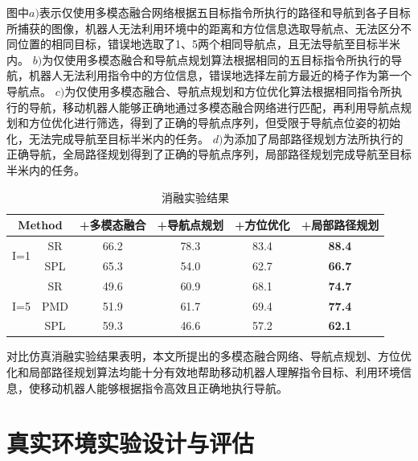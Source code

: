 图中$a)$表示仅使用多模态融合网络根据五目标指令所执行的路径和导航到各子目标所捕获的图像，机器人无法利用环境中的距离和方位信息选取导航点、无法区分不同位置的相同目标，错误地选取了1、5两个相同导航点，且无法导航至目标半米内。
$b)$为仅使用多模态融合和导航点规划算法根据相同的五目标指令所执行的导航，机器人无法利用指令中的方位信息，错误地选择左前方最近的椅子作为第一个导航点。
$c)$为仅使用多模态融合、导航点规划和方位优化算法根据相同指令所执行的导航，移动机器人能够正确地通过多模态融合网络进行匹配，再利用导航点规划和方位优化进行筛选，得到了正确的导航点序列，但受限于导航点位姿的初始化，无法完成导航至目标半米内的任务。
$d)$为添加了局部路径规划方法所执行的正确导航，全局路径规划得到了正确的导航点序列，局部路径规划完成导航至目标半米内的任务。


\begin{table}[]
    \caption{\label{Ablationtable}消融实验结果}
    \centering
        \begin{tabular}{cc|c|c|c|c}
        \hline
        \multicolumn{2}{c|}{Method}                     & +多模态融合 & +导航点规划 & +方位优化 & +局部路径规划 \\ \hline
        \multicolumn{1}{c|}{\multirow{2}{*}{I=1}} & SR  & 66.2   & 78.3   & 83.4  & \textbf{88.4}    \\
        \multicolumn{1}{c|}{}                     & SPL & 65.3   & 54.0   & 62.7  & \textbf{66.7}    \\ \hline
        \multicolumn{1}{c|}{\multirow{3}{*}{I=5}} & SR  & 49.6   & 60.9   & 68.1  & \textbf{74.7}    \\
        \multicolumn{1}{c|}{}                     & PMD & 51.9   & 61.7   & 69.4  & \textbf{77.4}    \\
        \multicolumn{1}{c|}{}                     & SPL & 59.3   & 46.6   & 57.2  & \textbf{62.1}    \\ \hline
        \end{tabular}
    \end{table}

对比仿真消融实验结果表明，本文所提出的多模态融合网络、导航点规划、方位优化和局部路径规划算法均能十分有效地帮助移动机器人理解指令目标、利用环境信息，使移动机器人能够根据指令高效且正确地执行导航。









\section{真实环境实验设计与评估}
